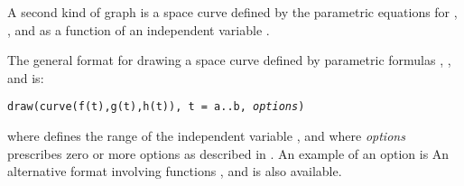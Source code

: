 
A second kind of \threedim{} graph is a \threedim{} space curve
defined by the parametric equations for , ,
and  as a function of an independent variable .

%
\beginImportant
The general format for drawing a \threedim{} space curve defined by
parametric formulas , , and
 is:
%
\begin{center}
{\tt draw(curve(f(t),g(t),h(t)), t = a..b, {\it options})}
\end{center}
where  defines the range of the independent variable
, and where {\it options} prescribes zero or more options
as described in .
An example of an option is 
An alternative format involving functions ,  and
 is also available.
\endImportant

